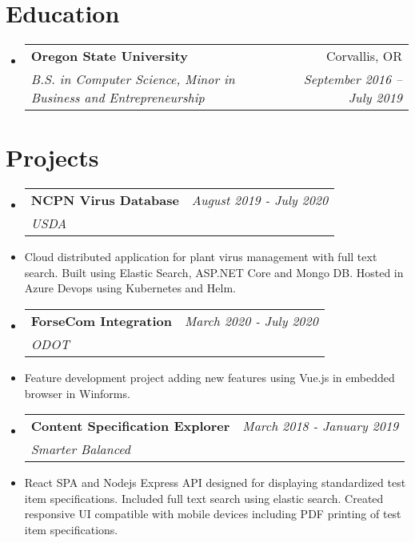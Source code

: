 \documentclass[letterpaper,11pt]{article}
\makeatletter
\newcommand{\resumeSubheading}[4]{
  \vspace{-1pt}\item
    \begin{tabular*}{0.97\textwidth}{l@{\extracolsep{\fill}}r}
      \textbf{\Large#1} & #2 \\
      \textit{\small#3} & \textit{\small #4} \\
    \end{tabular*}\vspace{-5pt}
}
\newcommand{\resumeSubHeadingListStart}{\begin{itemize}[label={},leftmargin=*]}
\newcommand{\resumeSubHeadingListEnd}{\end{itemize}}
\makeatother
\begin{document}
\section{Education}
  \resumeSubHeadingListStart
    \resumeSubheading
      {Oregon State University}{Corvallis, OR}
      {B.S. in Computer Science, Minor in Business and Entrepreneurship}{September 2016 -- July 2019}
  \resumeSubHeadingListEnd

\section{Projects}
  \resumeSubHeadingListStart
    \resumeSubheading
    {NCPN Virus Database}{\textit{August 2019 - July 2020 }}
    {USDA}{}
        \item{Cloud distributed application for plant virus management with full text search. Built using Elastic Search, ASP.NET Core and Mongo DB. Hosted in Azure Devops using Kubernetes and Helm.}\newline \hfill
        
    \resumeSubheading
    {ForseCom Integration}{ \textit{March 2020 - July 2020}}
    {ODOT}{}
        \item{Feature development project adding new features using Vue.js in embedded browser in Winforms.} \newline \hfill
    \resumeSubheading
        {Content Specification Explorer}{\textit{March 2018 - January 2019}}
    {Smarter Balanced}{}
        \item{React SPA and Nodejs Express API designed for displaying standardized test item specifications. Included full text search using elastic search. Created responsive UI compatible with mobile devices including PDF printing of test item specifications.} \newline \hfill
        

  \resumeSubHeadingListEnd
\end{document}
